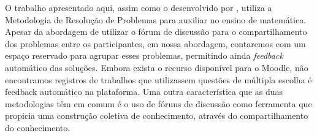 O trabalho apresentado aqui, assim como o desenvolvido por , utiliza a Metodologia de Resolu\c{c}\~ao de Problemas para auxiliar no ensino de matem\'atica. Apesar da abordagem de  utilizar o fórum de discussão para o compartilhamento dos problemas entre os participantes, em nossa abordagem, contaremos com um espaço reservado para agrupar esses problemas, permitindo ainda \textit{feedback} automático das soluções. Embora exista o recurso disponível para o Moodle, não encontramos registros de trabalhos que utilizassem questões de múltipla escolha é feedback automático na plataforma. Uma outra característica que as duas metodologias t\^em em comum \'e o uso de f\'oruns de discuss\~ao como ferramenta que propicia uma 
constru\c{c}\~ao coletiva de conhecimento, atrav\'es do compartilhamento do conhecimento.
